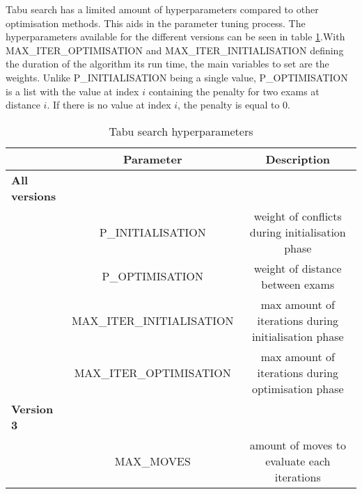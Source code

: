Tabu search has a limited amount of hyperparameters compared to other optimisation methods. This aids in the parameter tuning process. The hyperparameters  available for the different versions can be seen in table \ref{tab:possible_parameters}.With MAX\_ITER\_OPTIMISATION and MAX\_ITER\_INITIALISATION defining the duration of the algorithm its run time, the main variables to set are the weights. Unlike P\_INITIALISATION being a single value, P\_OPTIMISATION is a list with the value at index $i$ containing the penalty for two exams at distance $i$. If there is no value at index $i$, the penalty is equal to 0.

\begin{table}[h]
	\caption{Tabu search hyperparameters}
	\label{tab:possible_parameters}
	\centering
	\begin{tabular}{l c c}
		\hline
		& \textbf{Parameter} & \textbf{Description}  \\ \hline
        \textbf{All versions} & &\\ 
    
		& P\_INITIALISATION & weight of conflicts during initialisation phase \\
        & P\_OPTIMISATION  & weight of distance between exams\\
	    & MAX\_ITER\_INITIALISATION & max amount of iterations during initialisation phase \\
        & MAX\_ITER\_OPTIMISATION & max amount of iterations during optimisation phase\\ 
        \textbf{Version 3} & &\\ 
        & MAX\_MOVES & amount of moves to evaluate each iterations \\ 
        \hline
	\end{tabular}
\end{table}